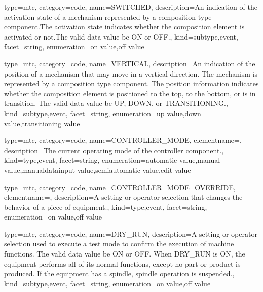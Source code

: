 {
  type=mtc,
  category=code,
  name={SWITCHED},
  description={An indication of the activation state of a mechanism represented by a \gls{composition} type component.The activation state indicates whether the \gls{composition} element is activated or not.The \gls{valid data value} \must be ON or OFF.},
  kind={subtype,event},
  facet={\gls{string}},
  enumeration={\gls{on value},\gls{off value}}
}


{
  type=mtc,
  category=code,
  name={VERTICAL},
  description={An indication of the position of a mechanism that may move in a vertical direction. The mechanism is represented by a \gls{composition} type component. \newline The position information indicates whether the \gls{composition} element is positioned to the top, to the bottom, or is in transition.  \newline The \gls{valid data value} \must be UP, DOWN, or TRANSITIONING.},
  kind={subtype,event},
  facet={\gls{string}},
  enumeration={\gls{up value},\gls{down value},\gls{transitioning value}}
}


{
  type=mtc,
  category=code,
  name={CONTROLLER\_MODE},
  elementname=,
  description={The current operating mode of the \gls{controller} component.},
  kind={type,event},
  facet={\gls{string}},
  enumeration={\gls{automatic value},\gls{manual value},\gls{manualdatainput value},\gls{semiautomatic value},\gls{edit value}}
}


{
  type=mtc,
  category=code,
  name={CONTROLLER\_MODE\_OVERRIDE},
  elementname=,
  description={A setting or operator selection that changes the behavior of a piece of equipment.},
  kind={type,event},
  facet={\gls{string}},
  enumeration={\gls{on value},\gls{off value}}
}


{
  type=mtc,
  category=code,
  name={DRY\_RUN},
  description={A setting or operator selection used to execute a test mode to confirm the execution of machine functions.  The \gls{valid data value} \must be ON or OFF. \newline When DRY\_RUN is ON, the equipment performs all of its normal functions, except no part or product is produced.  If the equipment has a spindle, spindle operation is suspended.},
  kind={subtype,event},
  facet={\gls{string}},
  enumeration={\gls{on value},\gls{off value}}
}


